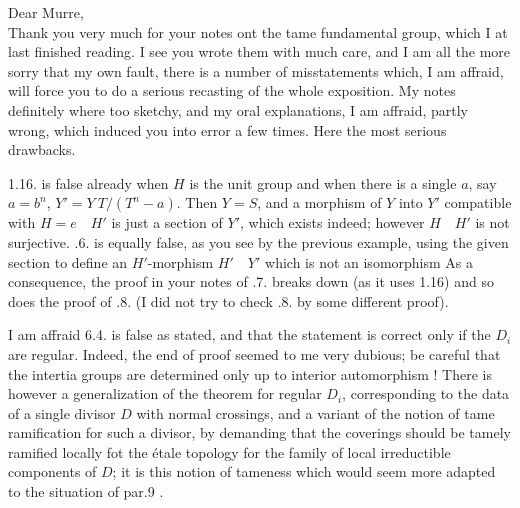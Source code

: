 Dear Murre,\\

Thank you very much for your notes ont the tame fundamental group, which I at last finished reading. I see you wrote them with much care, and I am all the more sorry that  my own fault, there is a number of misstatements which, I am affraid, will force you to do a serious recasting of the whole exposition. My notes definitely where too sketchy, and my oral explanations, I am affraid, partly wrong, which induced you into error a few times. Here the most serious drawbacks.

1.16. is false already when $H$ is the unit group and when there is a single $a$, say $a=b^n$, $Y'=Y\ T/(T^n-a)$. Then $Y=S$, and a morphism of $Y$ into $Y'$ compatible with $H=e\quad H'$ is just a section of $Y'$, which exists indeed; however $H\quad H'$ is not surjective. .6. is equally false, as you see by the previous example, using the given section to define an $H'$-morphism $H'\quad Y'$ which is not an isomorphism\handwritten{!} As a consequence, the proof in your notes of .7. breaks down (as it uses 1.16) and so does the proof of .8. (I did not try to check .8. by some different proof).

I am affraid  6.4. is false as stated, and that the statement is correct only if the $D_i$ are regular. Indeed, the end of   proof seemed to me very dubious; be careful that the intertia groups are determined only up to interior automorphism ! There is however a  generalization of the theorem for regular $D_i$, corresponding to the data of a single divisor $D$ with normal crossings, and a variant of the notion of tame ramification for such a divisor, by demanding that the coverings should be tamely ramified locally fot the étale topology for the family of local irreductible components of $D$; it is this notion of tameness which would seem more adapted to the situation of par.9 .
